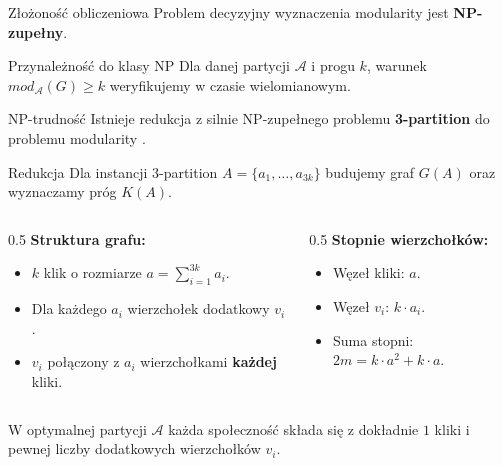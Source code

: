 \documentclass{beamer}
\begin{document}
\begin{frame}{Złożoność obliczeniowa}
    Problem decyzyjny wyznaczenia modularity jest \textbf{NP-zupełny}.
    \vspace{0.5cm}
    \begin{block}{Przynależność do klasy NP}
        Dla danej partycji $\mathcal{A}$ i progu $k$, warunek $mod_{\mathcal{A}}(G) \geq k$ weryfikujemy w czasie wielomianowym.
    \end{block}

    \begin{block}{NP-trudność}
        Istnieje redukcja z silnie NP-zupełnego problemu \textbf{3-partition} do problemu modularity \cite{BD08}.
    \end{block}
\end{frame}

\begin{frame}{Redukcja}
    Dla instancji 3-partition $A = \{a_1, \ldots, a_{3k}\}$ budujemy graf $G(A)$ oraz wyznaczamy próg \(K(A)\).
    \vspace{0.5cm}
    \begin{columns}[T]
        \begin{column}{0.5\textwidth}
            \textbf{Struktura grafu:}
            \begin{itemize}
                \item $k$ klik o rozmiarze $a = \sum_{i=1}^{3k} a_i$.
                \item Dla każdego $a_i$ wierzchołek dodatkowy $v_i$.
                \item $v_i$ połączony z $a_i$ wierzchołkami \textbf{każdej} kliki.
            \end{itemize}
        \end{column}
        \begin{column}{0.5\textwidth}
            \textbf{Stopnie wierzchołków:}
            \begin{itemize}
                \item Węzeł kliki: $a$.
                \item Węzeł $v_i$: $k \cdot a_i$.
                \item Suma stopni: $2m = k \cdot a^2 + k \cdot a$.
            \end{itemize}
        \end{column}
    \end{columns}

    \vspace{0.5cm}
    W optymalnej partycji \(\mathcal{A}\) każda społeczność składa się z dokładnie \(1\) kliki i pewnej liczby dodatkowych wierzchołków \(v_i\).
\end{frame}
\end{document}
